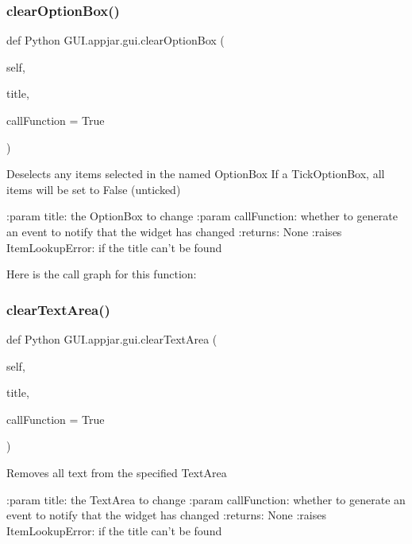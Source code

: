\subsubsection{\texorpdfstring{clear\+Option\+Box()}{clearOptionBox()}}
{\footnotesize\ttfamily def Python G\+U\+I.\+appjar.\+gui.\+clear\+Option\+Box (\begin{DoxyParamCaption}\item[{}]{self,  }\item[{}]{title,  }\item[{}]{call\+Function = {\ttfamily True} }\end{DoxyParamCaption})}

\begin{DoxyVerb}Deselects any items selected in the named OptionBox
If a TickOptionBox, all items will be set to False (unticked)

:param title: the OptionBox to change
:param callFunction: whether to generate an event to notify that the widget has changed
:returns: None
:raises ItemLookupError: if the title can't be found
\end{DoxyVerb}
 Here is the call graph for this function\+:
\mbox{\label{class_python_01_g_u_i_1_1appjar_1_1gui_a0e0c17c248b4e53c3039497db525e041}} 
\subsubsection{\texorpdfstring{clear\+Text\+Area()}{clearTextArea()}}
{\footnotesize\ttfamily def Python G\+U\+I.\+appjar.\+gui.\+clear\+Text\+Area (\begin{DoxyParamCaption}\item[{}]{self,  }\item[{}]{title,  }\item[{}]{call\+Function = {\ttfamily True} }\end{DoxyParamCaption})}

\begin{DoxyVerb}Removes all text from the specified TextArea

:param title: the TextArea to change
:param callFunction: whether to generate an event to notify that the widget has changed
:returns: None
:raises ItemLookupError: if the title can't be found
\end{DoxyVerb}
 \mbox{\label{class_python_01_g_u_i_1_1appjar_1_1gui_af92da83c8d10b81b590425a0a8fbffcb}} 
